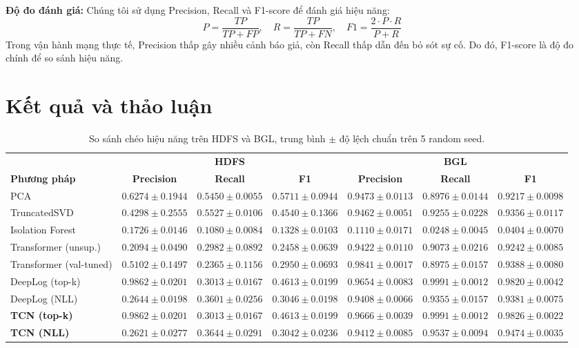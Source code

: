 \documentclass[conference]{IEEEtran}
\begin{document}
\textbf{Độ đo đánh giá:} Chúng tôi sử dụng Precision, Recall và F1-score để đánh giá hiệu năng:
\begin{equation}
P = \frac{TP}{TP + FP}, \quad R = \frac{TP}{TP + FN}, \quad F1 = \frac{2 \cdot P \cdot R}{P + R}
\label{eq_metrics}
\end{equation}
Trong vận hành mạng thực tế, Precision thấp gây nhiều cảnh báo giả, còn Recall thấp dẫn đến bỏ sót sự cố. Do đó, F1-score là độ đo chính để so sánh hiệu năng.


\section{Kết quả và thảo luận}

\begin{table}[!t]
\caption{So sánh chéo hiệu năng trên HDFS và BGL, trung bình $\pm$ độ lệch chuẩn trên 5 random seed.}
\centering
\scriptsize
\setlength{\tabcolsep}{3pt}
\begin{tabular}{l ccc ccc}
\toprule
& \multicolumn{3}{c}{\textbf{HDFS}} & \multicolumn{3}{c}{\textbf{BGL}} \\
\cmidrule(lr){2-4} \cmidrule(lr){5-7}
\textbf{Phương pháp} & \textbf{Precision} & \textbf{Recall} & \textbf{F1} & \textbf{Precision} & \textbf{Recall} & \textbf{F1} \\
\midrule
PCA & $0.6274 \pm 0.1944$ & $0.5450 \pm 0.0055$ & $0.5711 \pm 0.0944$ & $0.9473 \pm 0.0113$ & $0.8976 \pm 0.0144$ & $0.9217 \pm 0.0098$ \\
TruncatedSVD & $0.4298 \pm 0.2555$ & $0.5527 \pm 0.0106$ & $0.4540 \pm 0.1366$ & $0.9462 \pm 0.0051$ & $0.9255 \pm 0.0228$ & $0.9356 \pm 0.0117$ \\
Isolation Forest & $0.1726 \pm 0.0146$ & $0.1080 \pm 0.0084$ & $0.1328 \pm 0.0103$ & $0.1110 \pm 0.0171$ & $0.0248 \pm 0.0045$ & $0.0404 \pm 0.0070$ \\
\midrule
Transformer (unsup.) & $0.2094 \pm 0.0490$ & $0.2982 \pm 0.0892$ & $0.2458 \pm 0.0639$ & $0.9422 \pm 0.0110$ & $0.9073 \pm 0.0216$ & $0.9242 \pm 0.0085$ \\
Transformer (val-tuned) & $0.5102 \pm 0.1497$ & $0.2365 \pm 0.1156$ & $0.2950 \pm 0.0693$ & $0.9841 \pm 0.0017$ & $0.8975 \pm 0.0157$ & $0.9388 \pm 0.0080$ \\
DeepLog (top-k) & $0.9862 \pm 0.0201$ & $0.3013 \pm 0.0167$ & $0.4613 \pm 0.0199$ & $0.9654 \pm 0.0083$ & $\mathbf{0.9991 \pm 0.0012}$ & $0.9820 \pm 0.0042$ \\
DeepLog (NLL) & $0.2644 \pm 0.0198$ & $0.3601 \pm 0.0256$ & $0.3046 \pm 0.0198$ & $0.9408 \pm 0.0066$ & $0.9355 \pm 0.0157$ & $0.9381 \pm 0.0075$ \\
\midrule
\textbf{TCN (top-k)} & $0.9862 \pm 0.0201$ & $0.3013 \pm 0.0167$ & $0.4613 \pm 0.0199$ & $\mathbf{0.9666 \pm 0.0039}$ & $\mathbf{0.9991 \pm 0.0012}$ & $\mathbf{0.9826 \pm 0.0022}$ \\
\textbf{TCN (NLL)} & $0.2621 \pm 0.0277$ & $0.3644 \pm 0.0291$ & $0.3042 \pm 0.0236$ & $0.9412 \pm 0.0085$ & $0.9537 \pm 0.0094$ & $\mathbf{0.9474 \pm 0.0035}$ \\
\bottomrule
\end{tabular}
\label{tab_cross_dataset}
\end{table}
\end{document}
